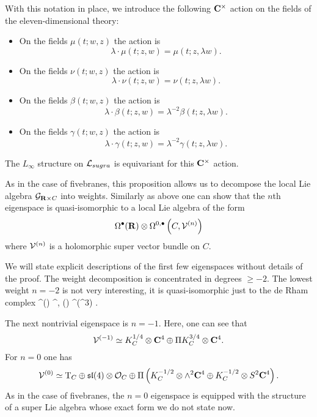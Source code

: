 \documentclass[11pt]{amsart}
\begin{document}
With this notation in place, we introduce the following $\mathbf{C}^\times$ action on the fields of the eleven-dimensional theory:
\begin{itemize}
\item On the fields $\mu(t;w,z)$ the action is
\[
\lambda \cdot \mu(t;z,w) = \mu(t; z , \lambda w).
\]
\item On the fields $\nu(t;w,z)$ the action is
\[
\lambda \cdot \nu(t;z,w) = \nu(t;z ,\lambda w).
\]
\item On the fields $\beta(t;w,z)$ the action is
\[
\lambda \cdot \beta(t;z,w) = \lambda^{-2} \beta(t; z, \lambda w).
\]
\item On the fields $\gamma(t;w,z)$ the action is
\[
\lambda \cdot \gamma(t;z,w) = \lambda^{-2} \gamma(t; z ,\lambda w).
\]
\end{itemize}

\begin{prop}
The $L_\infty$ structure on $\mathcal L_{sugra}$ is equivariant for this $\mathbf{C}^\times$ action. 
\end{prop}

As in the case of fivebranes, this proposition allows us to decompose the local Lie algebra $\mathcal G_{\mathbf{R} \times C}$ into weights. 
Similarly as above one can show that the $n$th eigenspace is quasi-isomorphic to a local Lie algebra of the form
\[
\Omega^\bullet(\mathbf{R}) \otimes \Omega^{0,\bullet}\left(C, \mathcal V^{(n)}\right)
\]
where $\mathcal V^{(n)}$ is a holomorphic super vector bundle on $C$.

We will state explicit descriptions of the first few eigenspaces without details of the proof. 
The weight decomposition is concentrated in degrees $\geq -2$. 
The lowest weight $n=-2$ is not very interesting, it is quasi-isomorphic just to the de Rham complex 
\beqn
\Omega^\bu (\R) \otimes \Omega^{\bu, \bu}(\C) \simeq \Omega^\bu (\R^3) .
\eeqn

The next nontrivial eigenspace is $n=-1$. 
Here, one can see that 
\[
\mathcal V^{(-1)} \simeq K_{C}^{1/4} \otimes \mathbf{C}^4 \oplus \Pi K^{3/4}_C \otimes \mathbf{C}^4 .
\]
For $n=0$ one has 
\[
\mathcal V^{(0)} \simeq {\rm T}_C \oplus \mathfrak{sl}(4) \otimes \mathcal O_C \oplus \Pi \left(K^{-1/2}_C \otimes \wedge^2 \mathbf{C}^4 \oplus K^{-1/2}_C \otimes S^2 \mathbf{C}^4\right) .
\]
As in the case of fivebranes, the $n=0$ eigenspace is equipped with the structure of a super Lie algebra whose exact form we do not state now.
\end{document}
